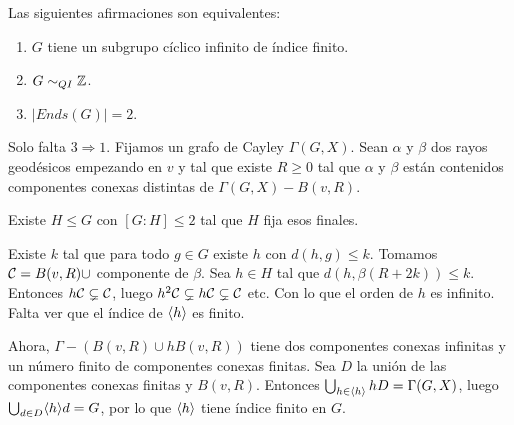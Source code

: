 \documentclass[twoside, 11pt]{article}
\begin{document}
\begin{teorema}
Las siguientes afirmaciones son equivalentes:
\begin{enumerate}
\item $G$ tiene un subgrupo cíclico infinito de índice finito.
\item $G\sim_{QI}\mathbb{Z}$.
\item $|Ends(G)|=2$.
\end{enumerate}
\end{teorema}
\begin{dem}
Solo falta $3\Rightarrow 1$. Fijamos un grafo de Cayley $\Gamma(G,X)$. Sean $\alpha$ y $\beta$ dos rayos geodésicos empezando en $v$ y tal que existe $R\geq 0$ tal que $\alpha$ y $\beta$ están contenidos componentes conexas distintas  de $\Gamma(G,X)-B(v,R)$.


Existe $H\leq G$ con $[G:H]\leq 2$ tal que $H$ fija esos finales.

Existe $k$ tal que para todo $g\in G$ existe $h$ con $d(h,g)\leq k$. Tomamos $\mathcal{C}=B(v,R)\cup$ componente de $\beta$. Sea $h\in H$ tal que $d(h,\beta(R+2k))\leq k$. Entonces $h\mathcal{C}\subsetneq \mathcal{C}$, luego $h^2\mathcal{C}\subsetneq h\mathcal{C}\subsetneq\mathcal{C}$ etc. Con lo que el orden de $h$ es infinito. Falta ver que el índice de $\langle{h}\rangle$ es finito. 

Ahora, $\Gamma-(B(v,R)\cup hB(v,R))$ tiene dos componentes conexas infinitas y un número finito de componentes conexas finitas. Sea $D$ la unión de las componentes conexas finitas y $B(v,R)$. Entonces $\bigcup_{h\in\langle{h}\rangle} hD=\Gamma(G,X)$, luego $\bigcup_{d\in D}\langle{h}\rangle d=G$, por lo que $\langle{h}\rangle$ tiene índice finito en $G$.
\QED
\end{dem}
\end{document}
